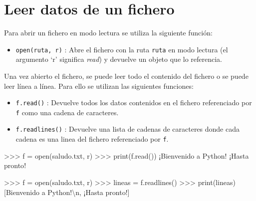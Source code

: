 \documentclass[
  spanish,
  a4paper,
]{scrreport}
\newenvironment{Shaded}{\begin{snugshade}}{\end{snugshade}}
\newcommand{\BuiltInTok}[1]{\textcolor[rgb]{0.00,0.23,0.31}{#1}}
\newcommand{\CharTok}[1]{\textcolor[rgb]{0.13,0.47,0.30}{#1}}
\newcommand{\NormalTok}[1]{\textcolor[rgb]{0.00,0.23,0.31}{#1}}
\newcommand{\OperatorTok}[1]{\textcolor[rgb]{0.37,0.37,0.37}{#1}}
\newcommand{\StringTok}[1]{\textcolor[rgb]{0.13,0.47,0.30}{#1}}
\providecommand{\tightlist}{%
  \setlength{\itemsep}{0pt}\setlength{\parskip}{0pt}}
\begin{document}
\section{Leer datos de un fichero}\label{leer-datos-de-un-fichero}

Para abrir un fichero en modo lectura se utiliza la siguiente función:

\begin{itemize}
\tightlist
\item
  \texttt{open(ruta,\ \textquotesingle{}r\textquotesingle{})} : Abre el
  fichero con la ruta \texttt{ruta} en modo lectura (el argumento `r'
  significa \emph{read}) y devuelve un objeto que lo referencia.
\end{itemize}

Una vez abierto el fichero, se puede leer todo el contenido del fichero
o se puede leer línea a línea. Para ello se utilizan las siguientes
funciones:

\begin{itemize}
\item
  \texttt{f.read()} : Devuelve todos los datos contenidos en el fichero
  referenciado por \texttt{f} como una cadena de caracteres.
\item
  \texttt{f.readlines()} : Devuelve una lista de cadenas de caracteres
  donde cada cadena es una linea del fichero referenciado por
  \texttt{f}.
\end{itemize}

\begin{Shaded}
\begin{Highlighting}[]
\OperatorTok{\textgreater{}\textgreater{}\textgreater{}}\NormalTok{ f }\OperatorTok{=} \BuiltInTok{open}\NormalTok{(}\StringTok{\textquotesingle{}saludo.txt\textquotesingle{}}\NormalTok{, }\StringTok{\textquotesingle{}r\textquotesingle{}}\NormalTok{)}
\OperatorTok{\textgreater{}\textgreater{}\textgreater{}} \BuiltInTok{print}\NormalTok{(f.read())}
\NormalTok{¡Bienvenido a Python}\OperatorTok{!}
\NormalTok{¡Hasta pronto}\OperatorTok{!}
\end{Highlighting}
\end{Shaded}

\begin{Shaded}
\begin{Highlighting}[]
\OperatorTok{\textgreater{}\textgreater{}\textgreater{}}\NormalTok{ f }\OperatorTok{=} \BuiltInTok{open}\NormalTok{(}\StringTok{\textquotesingle{}saludo.txt\textquotesingle{}}\NormalTok{, }\StringTok{\textquotesingle{}r\textquotesingle{}}\NormalTok{)}
\OperatorTok{\textgreater{}\textgreater{}\textgreater{}}\NormalTok{ lineas }\OperatorTok{=}\NormalTok{ f.readlines()}
\OperatorTok{\textgreater{}\textgreater{}\textgreater{}} \BuiltInTok{print}\NormalTok{(lineas)}
\NormalTok{[}\StringTok{\textquotesingle{}Bienvenido a Python!}\CharTok{\textbackslash{}n}\StringTok{\textquotesingle{}}\NormalTok{, }\StringTok{\textquotesingle{}¡Hasta pronto!\textquotesingle{}}\NormalTok{]}
\end{Highlighting}
\end{Shaded}
\end{document}
